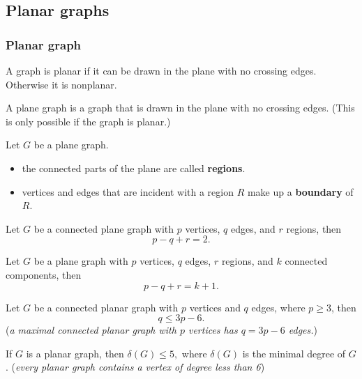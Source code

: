 \documentclass[aspectratio=169]{beamer}
\begin{document}


\subsection{Planar graphs}
\begin{frame}\frametitle{Planar graph}
\begin{definition}
A graph is planar if it can be drawn in the plane with no crossing edges. Otherwise it is nonplanar.
\end{definition}

\begin{definition}
A plane graph is a graph that is drawn in the plane with no crossing edges. (This is only possible if the graph is planar.)
\end{definition}
\end{frame}



\begin{frame}
Let $G$ be a plane graph.
\begin{itemize}
\item the connected parts of the plane are called {\bf regions}.
\item vertices and edges that are incident with a region $R$ make up a {\bf boundary} of $R$.
\end{itemize}

\begin{theorem}
Let $G$ be a connected plane graph with $p$ vertices, $q$ edges, and $r$ regions, then $$p-q+r=2.$$
\end{theorem}
\begin{corollary}
Let $G$ be a plane graph with $p$ vertices, $q$ edges, $r$ regions, and $k$ connected components, then $$p-q+r=k+1.$$
\end{corollary}
\end{frame}


\begin{frame}
\begin{theorem}
Let $G$ be a connected planar graph with $p$ vertices and $q$ edges, where $p\geq 3$, then $$q\leq 3p-6.$$
({\it a maximal connected planar graph with $p$ vertices has $q=3p-6$ edges.})
\end{theorem}
\begin{corollary}
If $G$ is a planar graph, then $\delta(G)\leq 5,$
where $\delta(G)$ is the minimal degree of $G$.
({\it every planar graph contains a vertex of degree less than 6})
\end{corollary}
\end{frame}
\end{document}
